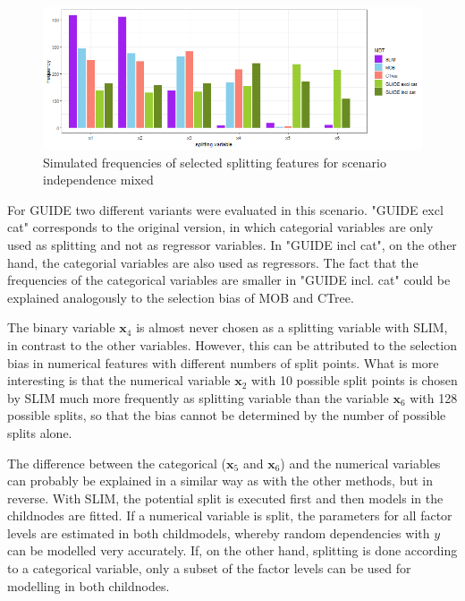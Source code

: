\begin{figure}[!htb]
    \centering
    \includegraphics[width=16cm]{Figures/simulations/batchtools/selection_bias_general/independence_mixed.png}
    \caption{Simulated frequencies of selected splitting features for scenario independence mixed}
    \label{fig:selection_bias_independence_mixed}
\end{figure}

For GUIDE two different variants were evaluated in this scenario. "GUIDE excl cat" corresponds to the original version, in which categorial variables are only used as splitting and not as regressor variables. In "GUIDE incl cat", on the other hand, the categorial variables are also used as regressors. The fact that the frequencies of the categorical variables are smaller in "GUIDE incl. cat" could be explained analogously to the selection bias of MOB and CTree.

The binary variable $\textbf{x}_4$ is almost never chosen as a splitting variable with SLIM, in contrast to the other variables. However, this can be attributed to the selection bias in numerical features with different numbers of split points. What is more interesting is that the numerical variable $\textbf{x}_2$ with 10 possible split points is chosen by SLIM much more frequently as splitting variable than the variable $\textbf{x}_6$ with 128 possible splits, so that the bias cannot be determined by the number of possible splits alone.

The difference between the categorical ($\textbf{x}_5$ and $\textbf{x}_6$) and the numerical variables can probably be explained in a similar way as with the other methods, but in reverse. With SLIM, the potential split is executed first and then models in the childnodes are fitted.  If a numerical variable is split, the parameters for all factor levels are estimated in both childmodels, whereby random dependencies with $y$ can be modelled very accurately. If, on the other hand, splitting is done according to a categorical variable, only a subset of the factor levels can be used for modelling in both childnodes.



